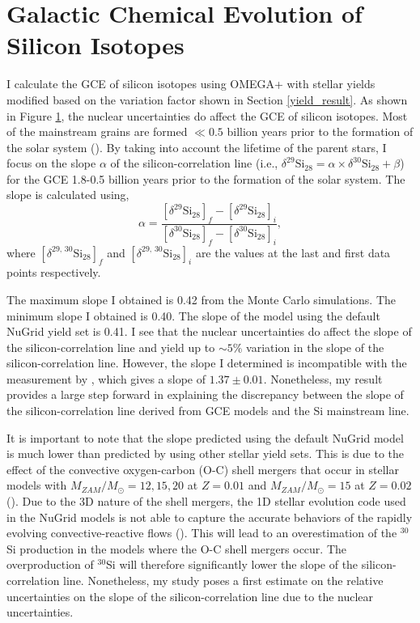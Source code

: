 \documentclass{brandeis-thesis3.2}
\def \msun {M_{\odot}}
\newcommand{\iso}[2]{$^{#1}${#2}}
\newcommand{\del}[3]{\delta^{#1}\text{#3}_{#2}}
\begin{document}
\section{Galactic Chemical Evolution of Silicon Isotopes} \label{gce_result}

I calculate the GCE of silicon isotopes using OMEGA+ with stellar yields modified based on the variation factor shown in Section \ref{yield_result}. As shown in Figure \ref{gce_result}, the nuclear uncertainties do affect the GCE of silicon isotopes. Most of the mainstream grains are formed $\ll 0.5$ billion years prior to the formation of the solar system (\citealt{Heck2020}). By taking into account the lifetime of the parent stars, I focus on the slope $\alpha$ of the silicon-correlation line (i.e., $\del{29}{28}{Si} = \alpha \times \del{30}{28}{Si} + \beta$) for the GCE 1.8-0.5 billion years prior to the formation of the solar system. The slope is calculated using, 
\begin{equation}
    \alpha = \frac{[\del{29}{28}{Si}]_f-[\del{29}{28}{Si}]_i}{[\del{30}{28}{Si}]_f-[\del{30}{28}{Si}]_i},
\end{equation}
where $[\del{29,\, 30}{28}{Si}]_f$ and $[\del{29,\, 30}{28}{Si}]_i$ are the values at the last and first data points respectively.

The maximum slope I obtained is 0.42 from the Monte Carlo simulations. The minimum slope I obtained is 0.40. The slope of the model using the default NuGrid yield set is 0.41. I see that the nuclear uncertainties do affect the slope of the silicon-correlation line and yield  up to $\sim 5\%$ variation in the slope of the silicon-correlation line. However, the slope I determined is incompatible with the measurement by \cite{Zinner2007}, which gives a slope of $1.37 \pm 0.01$. Nonetheless, my result provides a large step forward in explaining the discrepancy between the slope of the silicon-correlation line derived from GCE models and the Si mainstream line. 

It is important to note that the slope predicted using the default NuGrid model is much lower than predicted by using other stellar yield sets. This is due to the effect of the convective oxygen-carbon (O-C) shell mergers that occur in stellar models with $M_{ZAM}/\msun = 12, 15, 20$ at $Z=0.01$ and $M_{ZAM}/\msun = 15$ at $Z=0.02$ (\citealt{Ritter_2018}). Due to the 3D nature of the shell mergers, the 1D stellar evolution code used in the NuGrid models is not able to capture the accurate behaviors of the rapidly evolving convective-reactive flows (\cite{Andrassy_2019}). This will lead to an overestimation of the \iso{30}{Si} production in the models where the O-C shell mergers occur. The overproduction of \iso{30}{Si} will therefore significantly lower the slope of the silicon-correlation line. Nonetheless, my study poses a first estimate on the relative uncertainties on the slope of the silicon-correlation line due to the nuclear uncertainties. 
\end{document}
